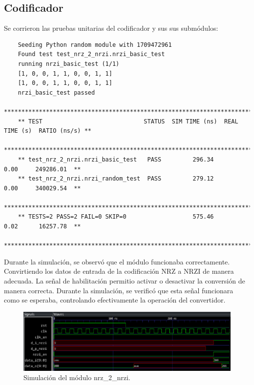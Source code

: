 \subsection{Codificador}

  Se corrieron las pruebas unitarias del codificador y sus sus submódulos:

  {\scriptsize\begin{verbatim}
    Seeding Python random module with 1709472961
    Found test test_nrz_2_nrzi.nrzi_basic_test
    running nrzi_basic_test (1/1)
    [1, 0, 0, 1, 1, 0, 0, 1, 1]
    [1, 0, 0, 1, 1, 0, 0, 1, 1]
    nrzi_basic_test passed
    *****************************************************************************************
    ** TEST                             STATUS  SIM TIME (ns)  REAL TIME (s)  RATIO (ns/s) **
    *****************************************************************************************
    ** test_nrz_2_nrzi.nrzi_basic_test   PASS         296.34           0.00     249286.01  **
    ** test_nrz_2_nrzi.nrzi_random_test  PASS         279.12           0.00     340029.54  **
    *****************************************************************************************
    ** TESTS=2 PASS=2 FAIL=0 SKIP=0                   575.46           0.02      16257.78  **
    *****************************************************************************************
  \end{verbatim}}

  Durante la simulación, se observó que el módulo funcionaba correctamente.
  Convirtiendo los datos de entrada de la codificación NRZ a NRZI de manera
  adecuada. La señal de habilitación permitio activar o desactivar la
  conversión de manera correcta. Durante la simulación, se verificó que esta
  señal funcionara como se esperaba, controlando efectivamente la operación
  del convertidor.

  \begin{figure}[h]
    \centering
    \includegraphics[width=1\textwidth]{./Figures/nrz2nrzi.png}
    \caption{Simulación del módulo nrz\_2\_nrzi.}\label{fig:nrzi}
  \end{figure}

